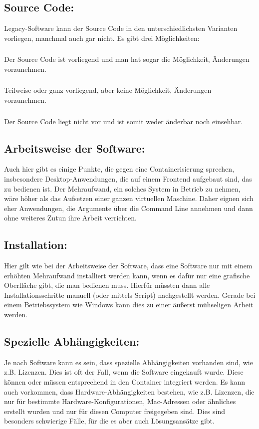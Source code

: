 \subsection{Source Code:}
Legacy-Software kann der Source Code in den unterschiedlichsten Varianten vorliegen, manchmal auch gar nicht. Es gibt drei Möglichkeiten:
\subsubsection{}
Der Source Code ist vorliegend und man hat sogar die Möglichkeit, Änderungen vorzunehmen.
\subsubsection{}
Teilweise oder ganz vorliegend, aber keine Möglichkeit, Änderungen vorzunehmen.
\subsubsection{}
Der Source Code liegt nicht vor und ist somit weder änderbar noch einsehbar.

\subsection{Arbeitsweise der Software:}
Auch hier gibt es einige Punkte, die gegen eine Containerisierung sprechen, insbesondere Desktop-Anwendungen, die auf einem Frontend aufgebaut sind, das zu bedienen ist.
Der Mehraufwand, ein solches System in Betrieb zu nehmen, wäre höher als das Aufsetzen einer ganzen virtuellen Maschine.
Daher eignen sich eher Anwendungen, die Argumente über die Command Line annehmen und dann ohne weiteres Zutun ihre Arbeit verrichten.

\subsection{Installation:}
Hier gilt wie bei der Arbeitsweise der Software, dass eine Software nur mit einem erhöhten Mehraufwand installiert werden kann, wenn es dafür nur eine grafische Oberfläche gibt, die man bedienen muss.
Hierfür müssten dann alle Installationsschritte manuell (oder mittels Script) nachgestellt werden. Gerade bei einem Betriebssystem wie Windows kann dies zu einer äußerst mühseligen Arbeit werden.

\subsection{Spezielle Abhängigkeiten:}
Je nach Software kann es sein, dass spezielle Abhängigkeiten vorhanden sind, wie z.B.  Lizenzen. Dies ist oft der Fall, wenn die Software eingekauft wurde.
Diese können oder müssen entsprechend in den Container integriert werden.
Es kann auch vorkommen, dass Hardware-Abhängigkeiten bestehen, wie z.B. Lizenzen, die nur für bestimmte Hardware-Konfigurationen, Mac-Adressen oder ähnliches erstellt wurden und nur für diesen Computer freigegeben sind.
Dies sind besonders schwierige Fälle, für die es aber auch Lösungsansätze gibt.

